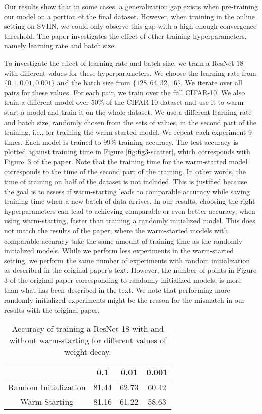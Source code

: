 Our results show that in some cases, a generalization gap exists when pre-training our model on a portion of the final dataset. However, when training in the online setting on SVHN, we could only observe this gap with a high enough convergence threshold. The paper investigates the effect of other training hyperparameters, namely learning rate and batch size.

To investigate the effect of learning rate and batch size, we train a ResNet-18 with different values for these hyperparameters. We choose the learning rate from $\{0.1, 0.01, 0.001\}$ and the batch size from $\{128, 64, 32, 16\}$. We iterate over all pairs for these values. For each pair, we train over the full CIFAR-10. We also train a different model over 50\% of the CIFAR-10 dataset and use it to warm-start a model and train it on the whole dataset. We use a different learning rate and batch size, randomly chosen from the sets of values, in the second part of the training, i.e., for training the warm-started model. We repeat each experiment 9 times. Each model is trained to $99\%$ training accuracy. The test accuracy is plotted against training time in Figure \ref{fig:fig3-scatter}, which corresponds with Figure~3 of the paper. Note that the training time for the warm-started model corresponds to the time of the second part of the training. In other words, the time of training on half of the dataset is not included. This is justified because the goal is to assess if warm-starting leads to comparable accuracy while saving training time when a new batch of data arrives. In our results, choosing the right hyperparameters can lead to achieving comparable or even better accuracy, when using warm-starting, faster than training a randomly initialized model. This does not match the results of the paper, where the warm-started models with comparable accuracy take the same amount of training time as the randomly initialized models. While we perform less experiments in the warm-started setting, we perform the same number of experiments with random initialization as described in the original paper's text. However, the number of points in Figure 3 of the original paper corresponding to randomly initialized models, is more than what has been described in the text. We note that performing more randomly initialized experiments might be the reason for the mismatch in our results with the original paper.


%

\begin{table}
    \renewcommand{\arraystretch}{1.2}
    \centering
    \begin{tabular}{c|c|c|c}
%
         & 0.1 & 0.01 & 0.001 \\ \hline
         Random Initialization & 81.44 & 62.73 & 60.42 \\
         Warm Starting & 81.16 & 61.22 & 58.63 \\ 
%
    \end{tabular}
    \vspace{10pt}
    \caption{Accuracy of training a ResNet-18 with and without warm-starting for different values of weight decay. }
    \label{tab:regularization}
\end{table}



